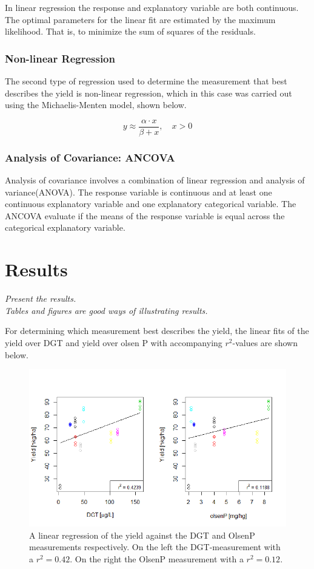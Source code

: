 \documentclass[11pt, fleqn, titlepage]{article}
\begin{document}
\noindent
In linear regression the response and explanatory variable are both continuous. The optimal parameters for the linear fit are estimated by the maximum likelihood. That is, to minimize the sum of squares of the residuals. 

\subsubsection*{Non-linear Regression}
The second type of regression used to determine the measurement that best describes the yield is non-linear regression, which in this case was carried out using the Michaelis-Menten model, shown below.

\[y \approx \frac{\alpha \cdot x}{\beta + x}, \quad x > 0 \]


\subsubsection*{Analysis of Covariance: ANCOVA}
Analysis of covariance involves a combination of linear regression and analysis of variance(ANOVA). The response variable is continuous and at least one continuous explanatory variable and one explanatory categorical variable. The ANCOVA evaluate if the means of the response variable is equal across the categorical explanatory variable.  \cite{statbog} 


\section{Results}
\textit{Present the results. \\ Tables and figures are good ways of illustrating results.}

For determining which measurement best describes the yield, the linear fits of the yield over DGT and yield over olsen P with accompanying $r^2$-values are shown below.

\begin{figure}[H]
	\centering
	\includegraphics[width=0.7\linewidth]{billeder/Linearfit.png}
	\caption{A linear regression of the yield against the DGT and OlsenP measurements respectively. On the left the DGT-measurement with a $ r^2 = 0.42 $. On the right the OlsenP measurement with a $ r^2 = 0.12 $.}
	\label{fig:linearfit}
\end{figure}
\end{document}
